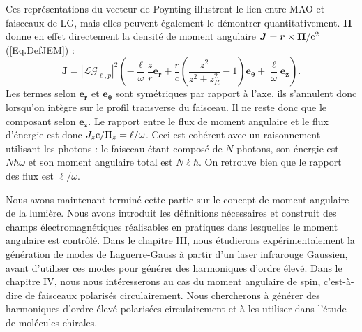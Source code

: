 Ces représentations du vecteur de Poynting illustrent le lien entre MAO et faisceaux de LG, mais elles peuvent également le démontrer quantitativement. $\bm{\Pi}$ donne en effet directement la densité de moment angulaire $\bm{J} = \bm{r}\times\bm{\Pi}/\mathrm{c}^2$ (\ref{Eq.DefJEM}) :
\begin{equation*}
\bm{J} = \left|\mathcal{LG}_{\ell,p}\right|^2\left(-\frac{\ell}{\omega}\frac{z}{r}\bm{e_r}+\frac{r}{c}\left(\frac{z^2}{z^2+z_R^2} -1\right)\bm{e_\theta}+\frac{\ell}{\omega}\bm{e_z}\right).
\end{equation*}
Les termes selon $\bm{e_r}$ et $\bm{e_\theta}$ sont symétriques par rapport à l'axe, ils s'annulent donc lorsqu'on intègre sur le profil transverse du faisceau. Il ne reste donc que le composant selon $\bm{e_z}$. Le rapport entre le flux de moment angulaire et le flux d'énergie est donc $J_z\mathrm{c}/\Pi_z = \ell/\omega$. Ceci est cohérent avec un raisonnement utilisant les photons : le faisceau étant composé de $N$ photons, son énergie est $N\hbar\omega$ et son moment angulaire total est $N\ell\hbar$. On retrouve bien que le rapport des flux est $\ell/\omega$.

Nous avons maintenant terminé cette partie sur le concept de moment angulaire de la lumière. Nous avons introduit les définitions nécessaires et construit des champs électromagnétiques réalisables en pratiques dans lesquelles le moment angulaire est contrôlé. Dans le chapitre III, nous étudierons expérimentalement la génération de modes de Laguerre-Gauss à partir d'un laser infrarouge Gaussien, avant d'utiliser ces modes pour générer des harmoniques d'ordre élevé. Dans le chapitre IV, nous nous intéresserons au cas du moment angulaire de spin, c'est-à-dire de faisceaux polarisés circulairement. Nous chercherons à générer des harmoniques d'ordre élevé polarisées circulairement et à les utiliser dans l'étude de molécules chirales.